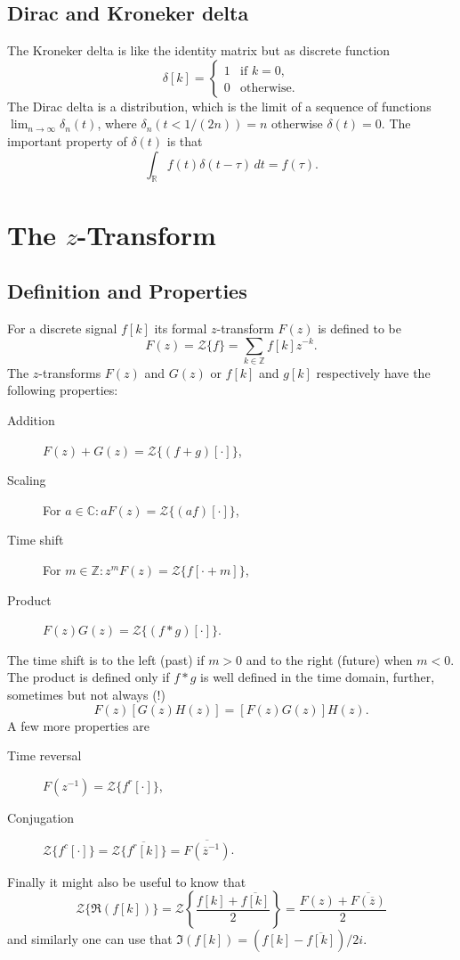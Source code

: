 \subsection{Dirac and Kroneker delta}

The Kroneker delta is like the identity matrix but as discrete function
\[
	\delta[k] = \begin{cases}
		1 & \text{if } k = 0, \\
		0 & \text{otherwise}.
	\end{cases}
\]
The Dirac delta is a distribution, which
is the limit of a sequence of functions $\lim_{n \to \infty} \delta_n(t)$,
where $\delta_n(t < 1/(2n)) = n$ otherwise $\delta(t) = 0$. The important
property of $\delta(t)$ is that
\[
	\int_\mathbb{R} f(t) \delta(t - \tau) \, dt = f(\tau).
\]

\section{The $z$-Transform}

\subsection{Definition and Properties}

For a discrete signal $f[k]$ its formal $z$-transform $F(z) $ is defined to be
\[
	F(z) = \mathcal{Z}\{f\} = \sum_{k\in\mathbb{Z}} f[k] z^{-k}.
\]
The $z$-transforms $F(z)$ and $G(z)$ or $f[k]$ and $g[k]$ respectively have
the following properties:
\begin{description}
	\item[Addition] $F(z) + G(z) = \mathcal{Z}\{(f + g)[\cdot]\}$,
	\item[Scaling] For $a \in \mathbb{C} : a F(z) = \mathcal{Z}\{(af)[\cdot]\}$,
	\item[Time shift] For $m \in \mathbb{Z} :
		z^m F(z) = \mathcal{Z}\{f[\cdot + m]\}$,
	\item[Product] $F(z) G(z) = \mathcal{Z}\{(f * g)[\cdot]\}$.
\end{description}
The time shift is to the left (past) if $m > 0$ and to the right (future) when
$m < 0$. The product is defined only if $f*g$ is well defined in the time
domain, further, sometimes but not always (!)
\[
	F(z)[G(z)H(z)] = [F(z)G(z)]H(z).
\] A few more properties are
\begin{description}
	\item[Time reversal] $F(z^{-1}) = \mathcal{Z}\{f^r[\cdot]\}$,
	\item[Conjugation] $\mathcal{Z}\{f^c[\cdot]\}
		= \mathcal{Z}\{\overline{f^r[k]}\}
		= \overline{F(\overline{z}^{-1})}$.
\end{description}
Finally it might also be useful to know that
\[
	\mathcal{Z}\{\Re{(f[k])}\}
	= \mathcal{Z}\left\{\frac{f[k] + \overline{f[k]}}{2}\right\}
	= \frac{F(z) + \overline{F(\overline{z})}}{2}
\]
and similarly one can use that $\Im(f[k]) = (f[k] - \overline{f[k]})/2i$.

